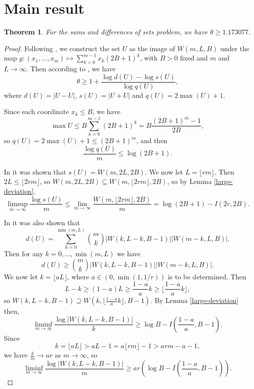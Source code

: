 \documentclass[12 pt]{article}
\newcommand{\floor}[1]{\lfloor {#1} \rfloor}
\newtheorem{thm}{Theorem}
\begin{document}
\section{Main result}
\begin{thm}
For the sums and differences of sets problem, we have $\theta \ge 1.173077$.
\end{thm}
\begin{proof}
Following \cite{gerbicz2025}, we construct the set $U$ as the image of $W(m, L, B)$ under the map $g: (x_1, \dots, x_m) \mapsto \sum_{k=0}^{m-1} x_k(2B + 1)^k$,
with $B > 0$ fixed and $m$ and $L\to\infty$. Then according to \cite{gyarmati2007}, we have
\[
\theta \ge 1 + \frac{\log d(U) - \log s(U)}{\log q(U)},
\]
where $d(U) = |U - U|$, $s(U) = |U + U|$ and $q(U) = 2\max(U) + 1$.

Since each coordinate $x_k \le B$, we have
\[
\max U \le B\sum_{k=0}^{m-1} (2B + 1)^k = B\frac{(2B + 1)^m - 1}{2B},
\]
so $q(U) = 2\max(U) + 1 \le (2B + 1)^m$, and then
\begin{equation}\label{q}
\frac{\log q(U)}m \le \log(2B + 1).
\end{equation}

In \cite{gerbicz2025} it was shown that $s(U) = W(m, 2L, 2B)$. We now let $L=\floor{rm}$.
Then $2L \le \floor{2rm}$, so $W(m, 2L, 2B) \subseteq W(m, \floor{2rm}, 2B)$,
so by Lemma \ref{large-deviation},
\begin{equation}\label{s}
\limsup_{m\to\infty} \frac{\log s(U)}m
\le \lim_{m\to\infty} \frac{W(m, \floor{2rm}, 2B)}m = \log(2B + 1) - I(2r, 2B).
\end{equation}

In \cite{gerbicz2025} it was also shown that
\[
d(U) = \sum_{k=0}^{\min(m,L)} {m \choose k}|W(k, L - k, B - 1)||W(m - k, L, B)|.
\]
Then for any $k = 0, \dots, \min(m, L)$ we have
\[
d(U) \ge {m \choose k}|W(k, L - k, B - 1)||W(m - k, L, B)|.
\]
We now let $k = \floor{aL}$, where $a \in (0, \min(1, 1/r))$ is to be determined.
Then
\[
L - k \ge (1 - a)L \ge \frac{1 - a}ak\ge \floor{\frac{1 - a}ak},
\]
so $W(k, L - k, B - 1) \supseteq W(k, \floor{\frac{1 - a}ak}, B - 1)$.
By Lemma \ref{large-deviation} then,
\[
\liminf_{m\to\infty} \frac{\log|W(k, L - k, B - 1)|}k
\ge \log B - I\left( \frac{1-a}a, B - 1 \right).
\]
Since
\[
k = \floor{aL} > aL - 1 = a\floor{rm} - 1 > arm - a - 1,
\]
we have $\frac km \to ar$ as $m \to \infty$, so
\begin{equation}\label{W1}
\liminf_{m\to\infty} \frac{\log|W(k, L - k, B - 1)|}m
\ge ar\left( \log B - I\left( \frac{1-a}a, B - 1 \right) \right).
\end{equation}


\end{proof}
\end{document}
